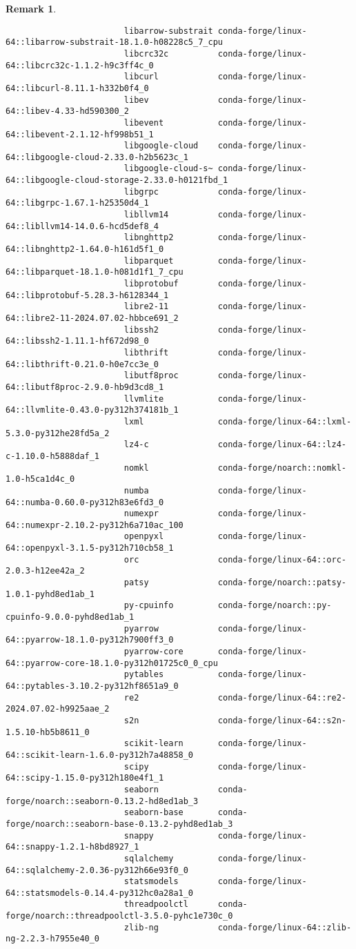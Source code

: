 \documentclass{article}
\newtheorem{remark}{Remark}
\begin{document}
\begin{enumerate}
\begin{itemize}
\begin{itemize}
\begin{itemize}
\begin{remark}
\begin{verbatim}
						libarrow-substrait conda-forge/linux-64::libarrow-substrait-18.1.0-h08228c5_7_cpu 
						libcrc32c          conda-forge/linux-64::libcrc32c-1.1.2-h9c3ff4c_0 
						libcurl            conda-forge/linux-64::libcurl-8.11.1-h332b0f4_0 
						libev              conda-forge/linux-64::libev-4.33-hd590300_2 
						libevent           conda-forge/linux-64::libevent-2.1.12-hf998b51_1 
						libgoogle-cloud    conda-forge/linux-64::libgoogle-cloud-2.33.0-h2b5623c_1 
						libgoogle-cloud-s~ conda-forge/linux-64::libgoogle-cloud-storage-2.33.0-h0121fbd_1 
						libgrpc            conda-forge/linux-64::libgrpc-1.67.1-h25350d4_1 
						libllvm14          conda-forge/linux-64::libllvm14-14.0.6-hcd5def8_4 
						libnghttp2         conda-forge/linux-64::libnghttp2-1.64.0-h161d5f1_0 
						libparquet         conda-forge/linux-64::libparquet-18.1.0-h081d1f1_7_cpu 
						libprotobuf        conda-forge/linux-64::libprotobuf-5.28.3-h6128344_1 
						libre2-11          conda-forge/linux-64::libre2-11-2024.07.02-hbbce691_2 
						libssh2            conda-forge/linux-64::libssh2-1.11.1-hf672d98_0 
						libthrift          conda-forge/linux-64::libthrift-0.21.0-h0e7cc3e_0 
						libutf8proc        conda-forge/linux-64::libutf8proc-2.9.0-hb9d3cd8_1 
						llvmlite           conda-forge/linux-64::llvmlite-0.43.0-py312h374181b_1 
						lxml               conda-forge/linux-64::lxml-5.3.0-py312he28fd5a_2 
						lz4-c              conda-forge/linux-64::lz4-c-1.10.0-h5888daf_1 
						nomkl              conda-forge/noarch::nomkl-1.0-h5ca1d4c_0 
						numba              conda-forge/linux-64::numba-0.60.0-py312h83e6fd3_0 
						numexpr            conda-forge/linux-64::numexpr-2.10.2-py312h6a710ac_100 
						openpyxl           conda-forge/linux-64::openpyxl-3.1.5-py312h710cb58_1 
						orc                conda-forge/linux-64::orc-2.0.3-h12ee42a_2 
						patsy              conda-forge/noarch::patsy-1.0.1-pyhd8ed1ab_1 
						py-cpuinfo         conda-forge/noarch::py-cpuinfo-9.0.0-pyhd8ed1ab_1 
						pyarrow            conda-forge/linux-64::pyarrow-18.1.0-py312h7900ff3_0 
						pyarrow-core       conda-forge/linux-64::pyarrow-core-18.1.0-py312h01725c0_0_cpu 
						pytables           conda-forge/linux-64::pytables-3.10.2-py312hf8651a9_0 
						re2                conda-forge/linux-64::re2-2024.07.02-h9925aae_2 
						s2n                conda-forge/linux-64::s2n-1.5.10-hb5b8611_0 
						scikit-learn       conda-forge/linux-64::scikit-learn-1.6.0-py312h7a48858_0 
						scipy              conda-forge/linux-64::scipy-1.15.0-py312h180e4f1_1 
						seaborn            conda-forge/noarch::seaborn-0.13.2-hd8ed1ab_3 
						seaborn-base       conda-forge/noarch::seaborn-base-0.13.2-pyhd8ed1ab_3 
						snappy             conda-forge/linux-64::snappy-1.2.1-h8bd8927_1 
						sqlalchemy         conda-forge/linux-64::sqlalchemy-2.0.36-py312h66e93f0_0 
						statsmodels        conda-forge/linux-64::statsmodels-0.14.4-py312hc0a28a1_0 
						threadpoolctl      conda-forge/noarch::threadpoolctl-3.5.0-pyhc1e730c_0 
						zlib-ng            conda-forge/linux-64::zlib-ng-2.2.3-h7955e40_0 
						

\end{verbatim}
\end{remark}
\end{itemize}
\end{itemize}
\end{itemize}
\end{enumerate}
\end{document}
